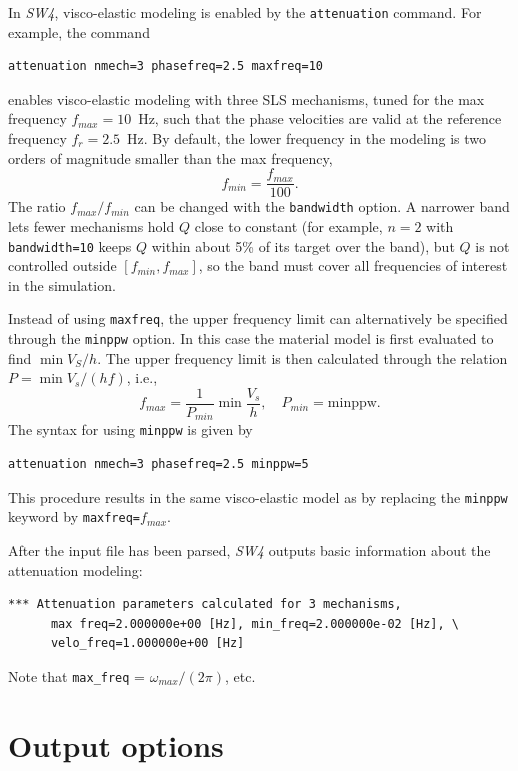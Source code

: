 \documentclass[11pt]{report}
\begin{document}
{In \emph{SW4}, visco-elastic modeling is enabled by the {\tt attenuation} command. For example, the
command
\begin{verbatim}
attenuation nmech=3 phasefreq=2.5 maxfreq=10
\end{verbatim}
enables visco-elastic modeling with three SLS mechanisms, tuned for the max frequency
$f_{max}=10$~Hz, such that the phase velocities are valid at the reference frequency
$f_r=2.5$~Hz. By default, the lower frequency in the modeling is two orders of
magnitude smaller than the max frequency,
\[
	f_{min}=\frac{f_{max}}{100}.
\]
The ratio $f_{max}/f_{min}$ can be changed with the \verb+bandwidth+ option. A narrower band lets
fewer mechanisms hold $Q$ close to constant (for example, $n=2$ with \verb+bandwidth=10+ keeps
$Q$ within about 5\% of its target over the band), but $Q$ is not controlled outside
$[f_{min},f_{max}]$, so the band must cover all frequencies of interest in the simulation.

Instead of using \verb+maxfreq+, the upper frequency limit can alternatively be specified through the
\verb+minppw+ option. In this case the material model is first evaluated to find $\min V_S/h$. The
upper frequency limit is then calculated through the relation $P=\min V_s/(h
	f)$, i.e.,
\[
	f_{max} = \frac{1}{P_{min}}\min \frac{V_s}{h},\quad P_{min}=\mbox{minppw}.
\]
The syntax for using \verb+minppw+ is given by
\begin{verbatim}
attenuation nmech=3 phasefreq=2.5 minppw=5
\end{verbatim}
This procedure results in the same visco-elastic model as by replacing the \verb+minppw+ keyword by \verb+maxfreq=+$f_{max}$.

After the input file has been parsed, \emph{SW4} outputs basic information about the attenuation
modeling:
\begin{verbatim}
*** Attenuation parameters calculated for 3 mechanisms, 
      max freq=2.000000e+00 [Hz], min_freq=2.000000e-02 [Hz], \
      velo_freq=1.000000e+00 [Hz]
\end{verbatim}
Note that \verb+max_freq+ = $\omega_{max}/(2\pi)$, etc.


\chapter{Output options}
}
\end{document}

